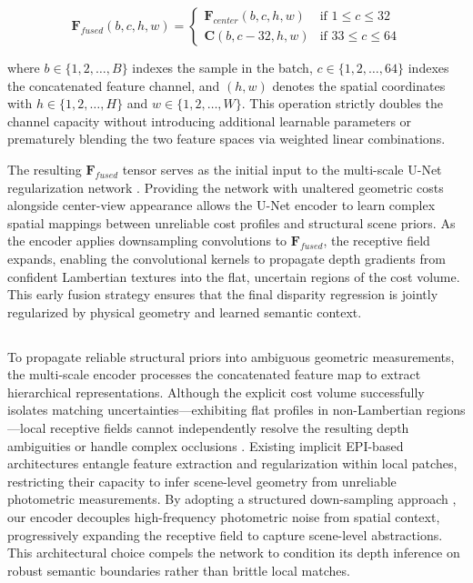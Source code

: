 \documentclass[lettersize,journal]{IEEEtran}
\begin{document}
\begin{equation}
\mathbf{F}_{fused}(b, c, h, w) = 
\begin{cases} 
\mathbf{F}_{center}(b, c, h, w) & \text{if } 1 \leq c \leq 32 \\ 
\mathbf{C}(b, c - 32, h, w) & \text{if } 33 \leq c \leq 64 
\end{cases}
\end{equation}

where $b \in \{1, 2, \dots, B\}$ indexes the sample in the batch, $c \in \{1, 2, \dots, 64\}$ indexes the concatenated feature channel, and $(h, w)$ denotes the spatial coordinates with $h \in \{1, 2, \dots, H\}$ and $w \in \{1, 2, \dots, W\}$. This operation strictly doubles the channel capacity without introducing additional learnable parameters or prematurely blending the two feature spaces via weighted linear combinations. 

The resulting $\mathbf{F}_{fused}$ tensor serves as the initial input to the multi-scale U-Net regularization network \cite{ronneberger2015}. Providing the network with unaltered geometric costs alongside center-view appearance allows the U-Net encoder to learn complex spatial mappings between unreliable cost profiles and structural scene priors. As the encoder applies downsampling convolutions to $\mathbf{F}_{fused}$, the receptive field expands, enabling the convolutional kernels to propagate depth gradients from confident Lambertian textures into the flat, uncertain regions of the cost volume. This early fusion strategy ensures that the final disparity regression is jointly regularized by physical geometry and learned semantic context.

\subsection{}

To propagate reliable structural priors into ambiguous geometric measurements, the multi-scale encoder processes the concatenated feature map to extract hierarchical representations. Although the explicit cost volume successfully isolates matching uncertainties—exhibiting flat profiles in non-Lambertian regions—local receptive fields cannot independently resolve the resulting depth ambiguities or handle complex occlusions \cite{chen2017}. Existing implicit EPI-based architectures \cite{heber2018} entangle feature extraction and regularization within local patches, restricting their capacity to infer scene-level geometry from unreliable photometric measurements. By adopting a structured down-sampling approach \cite{ronneberger2015}, our encoder decouples high-frequency photometric noise from spatial context, progressively expanding the receptive field to capture scene-level abstractions. This architectural choice compels the network to condition its depth inference on robust semantic boundaries rather than brittle local matches.
\end{document}
